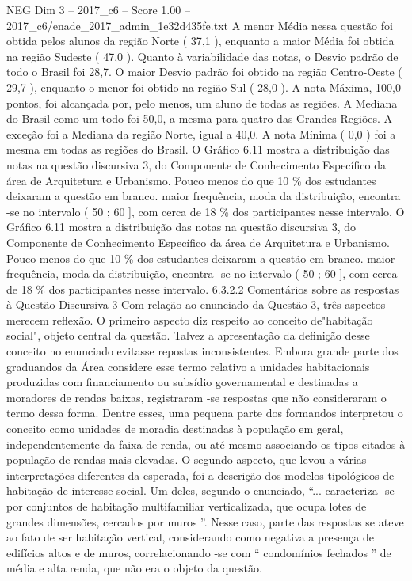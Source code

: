 \begin{textsample}{NEG Dim 3 – 2017\_c6 – Score 1.00 – 2017\_c6/enade\_2017\_admin\_1e32d435fe.txt}
A menor Média nessa questão foi obtida pelos alunos da região Norte ( 37,1 ), enquanto a maior Média foi obtida na região Sudeste ( 47,0 ).
Quanto à variabilidade das notas, o Desvio padrão de todo o Brasil foi 28,7.
O maior Desvio padrão foi obtido na região Centro-Oeste ( 29,7 ), enquanto o menor foi obtido na região Sul ( 28,0 ).
A nota Máxima, 100,0 pontos, foi alcançada por, pelo menos, um aluno de todas as regiões.
A Mediana do Brasil como um todo foi 50,0, a mesma para quatro das Grandes Regiões.
A exceção foi a Mediana da região Norte, igual a 40,0.
A nota Mínima ( 0,0 ) foi a mesma em todas as regiões do Brasil.
O Gráfico 6.11 mostra a distribuição das notas na questão discursiva 3, do Componente de Conhecimento Específico da área de Arquitetura e Urbanismo.
Pouco menos do que 10 \% dos estudantes deixaram a questão em branco. maior frequência, moda da distribuição, encontra -se no intervalo ( 50 ; 60 ], com cerca de 18 \% dos participantes nesse intervalo.
O Gráfico 6.11 mostra a distribuição das notas na questão discursiva 3, do Componente de Conhecimento Específico da área de Arquitetura e Urbanismo.
Pouco menos do que 10 \% dos estudantes deixaram a questão em branco. maior frequência, moda da distribuição, encontra -se no intervalo ( 50 ; 60 ], com cerca de 18 \% dos participantes nesse intervalo. 6.3.2.2 Comentários sobre as respostas à Questão Discursiva 3 Com relação ao enunciado da Questão 3, três aspectos merecem reflexão.
O primeiro aspecto diz respeito ao conceito de"habitação social", objeto central da questão.
Talvez a apresentação da definição desse conceito no enunciado evitasse repostas inconsistentes.
Embora grande parte dos graduandos da Área considere esse termo relativo a unidades habitacionais produzidas com financiamento ou subsídio governamental e destinadas a moradores de rendas baixas, registraram -se respostas que não consideraram o termo dessa forma.
Dentre esses, uma pequena parte dos formandos interpretou o conceito como unidades de moradia destinadas à população em geral, independentemente da faixa de renda, ou até mesmo associando os tipos citados à população de rendas mais elevadas.
O segundo aspecto, que levou a várias interpretações diferentes da esperada, foi a descrição dos modelos tipológicos de habitação de interesse social.
Um deles, segundo o enunciado, “... caracteriza -se por conjuntos de habitação multifamiliar verticalizada, que ocupa lotes de grandes dimensões, cercados por muros ”.
Nesse caso, parte das respostas se ateve ao fato de ser habitação vertical, considerando como negativa a presença de edifícios altos e de muros, correlacionando -se com “ condomínios fechados ” de média e alta renda, que não era o objeto da questão.

\end{textsample}
